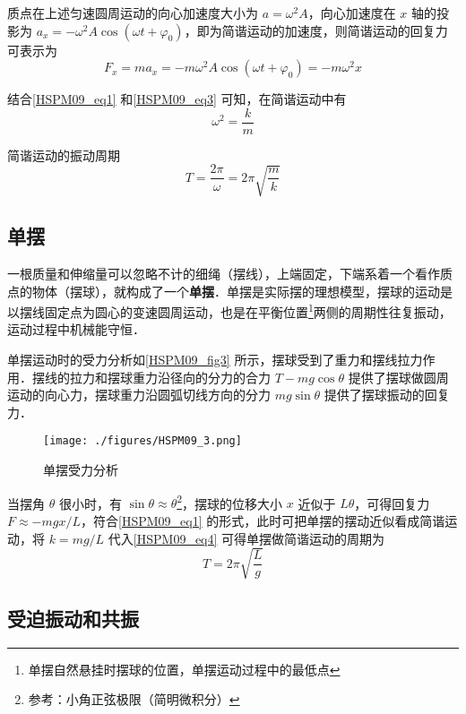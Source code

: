 质点在上述匀速圆周运动的向心加速度大小为 $a=\omega^2 A$，向心加速度在 $x$ 轴的投影为 $a_x=-\omega^2 A\cos(\omega t + \varphi_0)$，即为简谐运动的加速度，则简谐运动的回复力可表示为
\begin{equation}\label{HSPM09_eq3}
F_x=ma_x=-m\omega^2 A\cos(\omega t + \varphi_0)= -m\omega^2 x
\end{equation}

结合\autoref{HSPM09_eq1} 和\autoref{HSPM09_eq3} 可知，在简谐运动中有
\begin{equation}
\omega^2=\frac km
\end{equation}

简谐运动的振动周期
\begin{equation}\label{HSPM09_eq4}
T=\frac {2\pi}{\omega}=2\pi\sqrt{\frac mk}
\end{equation}


\subsection{单摆}

一根质量和伸缩量可以忽略不计的细绳（摆线），上端固定，下端系着一个看作质点的物体（摆球），就构成了一个\textbf{单摆}．单摆是实际摆的理想模型，摆球的运动是以摆线固定点为圆心的变速圆周运动，也是在平衡位置\footnote{单摆自然悬挂时摆球的位置，单摆运动过程中的最低点}两侧的周期性往复振动，运动过程中机械能守恒．

单摆运动时的受力分析如\autoref{HSPM09_fig3} 所示，摆球受到了重力和摆线拉力作用．摆线的拉力和摆球重力沿径向的分力的合力 $T-mg\cos\theta$ 提供了摆球做圆周运动的向心力，摆球重力沿圆弧切线方向的分力 $mg\sin\theta$ 提供了摆球振动的回复力．

\begin{figure}[ht]
\centering
\texttt{[image: ./figures/HSPM09\_3.png]}
\caption{单摆受力分析} \label{HSPM09_fig3}
\end{figure}

当摆角 $\theta$ 很小时，有 $\sin\theta \approx \theta$\footnote{参考：小角正弦极限（简明微积分）}，摆球的位移大小 $x$ 近似于 $L\theta$，可得回复力 $F \approx -mgx/L$，符合\autoref{HSPM09_eq1} 的形式，此时可把单摆的摆动近似看成简谐运动，将 $k=mg/L$ 代入\autoref{HSPM09_eq4} 可得单摆做简谐运动的周期为
\begin{equation}
T=2\pi\sqrt{\frac Lg}
\end{equation}

\subsection{受迫振动和共振}

